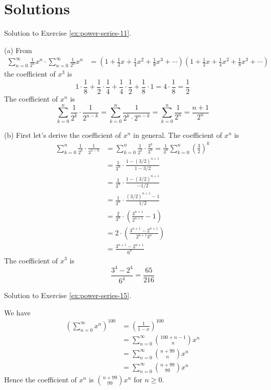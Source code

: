 
\newpage
\section*{Solutions}
Solution to Exercise \ref{ex:power-series-11}.

 
(a) From
\begin{align*}
\sum_{n = 0}^\infty \frac{1}{2^n} x^n \cdot \sum_{n = 0}^\infty \frac{1}{2^n} x^n
&=
\left(
1 + \frac{1}{2}x + \frac{1}{4}x^2 + \frac{1}{8}x^3 + \cdots
\right)
\left(
1 + \frac{1}{2}x + \frac{1}{4}x^2 + \frac{1}{8}x^3 + \cdots
\right)
\end{align*}
the coefficient of $x^3$ is
\[
1 \cdot \frac{1}{8}
+ \frac{1}{2} \cdot \frac{1}{4}
+ \frac{1}{4} \cdot \frac{1}{2}
+ \frac{1}{8} \cdot 1
= 4 \cdot \frac{1}{8} = \frac{1}{2}
\]
The coefficient of $x^n$ is
\[
\sum_{k=0}^n \frac{1}{2^k} \cdot \frac{1}{2^{n-k}}
= \sum_{k=0}^n \frac{1}{2^k \cdot 2^{n-k}}
= \sum_{k=0}^n \frac{1}{2^n}
= \frac{n + 1}{2^n}
\]

(b)
First let's derive the coefficient of $x^n$ in general. 
The coefficient of $x^n$ is
\begin{align*}
\sum_{k=0}^n \frac{1}{2^k} \cdot \frac{1}{3^{n-k}}
&= \sum_{k=0}^n \frac{1}{2^k} \cdot \frac{3^k}{3^n} 
= \frac{1}{3^n} \sum_{k=0}^n \left(\frac{3}{2}\right)^k \\
&= \frac{1}{3^n} \cdot \frac{1 - (3/2)^{n+1}}{1 - 3/2} \\
&= \frac{1}{3^n} \cdot \frac{1 - (3/2)^{n+1}}{-1/2} \\
&= \frac{1}{3^n} \cdot \frac{(3/2)^{n+1} - 1}{1/2} \\
&= \frac{2}{3^n} \cdot \left( \frac{3^{n+1}}{2^{n+1}} - 1 \right) \\
&= 2 \cdot \left( \frac{3^{n+1} - 2^{n+1}}{2^{n+1}3^n} \right) \\
&= \frac{3^{n+1} - 2^{n+1}}{6^n}
\end{align*}
The coefficient of $x^3$ is
\[
\frac{3^4 - 2^{4}}{6^4} = \frac{65}{216}
\]



\newpage

Solution to Exercise \ref{ex:power-series-15}.

We have
\begin{align*}
\left( \sum_{n=0}^\infty x^n \right)^{100} 
&= \left( \frac{1}{1 - x} \right)^{100} \\
&= \sum_{n=0}^\infty \binom{100 + n - 1}{n} x^n \\
&= \sum_{n=0}^\infty \binom{n + 99}{n} x^n \\
&= \sum_{n=0}^\infty \binom{n + 99}{99} x^n
\end{align*}
Hence the coefficient of $x^n$ is $\binom{n + 99}{99} x^n$ for $n \geq 0$.



